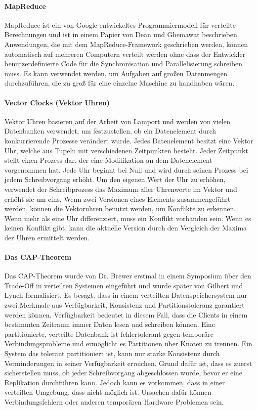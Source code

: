 \paragraph{MapReduce} MapReduce ist ein von Google entwickeltes Programmiermodell für verteilte Berechnungen und ist in einem Papier von Dean und Ghemawat \cite{Dean:2008:MSD:1327452.1327492} beschrieben. Anwendungen, die mit dem MapReduce-Framework geschrieben werden, können automatisch auf mehreren Computern verteilt werden ohne dass der Entwickler benutzerdefinierte Code für die Synchronisation und Parallelisierung schreiben muss. Es kann verwendet werden, um Aufgaben auf großen Datenmengen durchzuführen, die zu groß für eine einzelne Maschine zu handhaben wären.


\paragraph{Vector Clocks (Vektor Uhren)}
Vektor Uhren basieren auf der Arbeit von Lamport \cite{Lamport:1978:TCO:359545.359563} und werden von vielen Datenbanken verwendet, um festzustellen, ob ein Datenelement durch konkurrierende Prozesse verändert wurde. Jedes Datenelement besitzt eine Vektor Uhr, welche aus Tupeln mit verschiedenen Zeitpunkten besteht. Jeder Zeitpunkt stellt einen Prozess dar, der eine Modifikation an dem Datenelement vorgenommen hat. Jede Uhr beginnt bei Null und wird durch seinen Prozess bei jedem Schreibvorgang erhöht. Um den eigenen Wert der Uhr zu erhöhen, verwendet der Schreibprozess das Maximum aller Uhrenwerte im Vektor und erhöht sie um eins. Wenn zwei Versionen eines Elements zusammengeführt werden, können die Vektoruhren benutzt werden, um Konflikte zu erkennen. Wenn mehr als eine Uhr differenziert, muss ein Konflikt vorhanden sein. Wenn es keinen Konflikt gibt, kann die aktuelle Version durch den Vergleich der Maxima der Uhren ermittelt werden.

\paragraph{Das CAP-Theorem} Das CAP-Theorem wurde von Dr. Brewer erstmal in einem Symposium \cite{cap2010} über den Trade-Off in verteilten Systemen eingeführt und wurde später von Gilbert und Lynch \cite{Gilbert:2002:BCF:564585.564601} formalisiert. Es besagt, dass in einem verteilten Datenspeichersystem nur zwei Merkmale aus Verfügbarkeit, Konsistenz und  Partitionstoleranz garantiert werden können. Verfügbarkeit bedeutet in diesem Fall, dass die Clients in einem bestimmten Zeitraum immer Daten lesen und schreiben können. Eine partitionierte, verteilte Datenbank ist fehlertolerant gegen temporäre Verbindungsprobleme und ermöglicht es Partitionen über Knoten zu trennen. Ein System das tolerant partitioniert ist, kann nur starke Konsistenz durch Verminderungen in seiner Verfügbarkeit erreichen. Grund dafür ist, dass es zuerst sicherstellen muss, ob jeder Schreibvorgang abgeschlossen wurde, bevor er eine Replikation durchführen kann. Jedoch kann es vorkommen, dass in einer verteilten Umgebung, dass nicht möglich ist. Ursachen dafür können Verbindungsfehlern oder anderen temporären Hardware Problemen sein.

